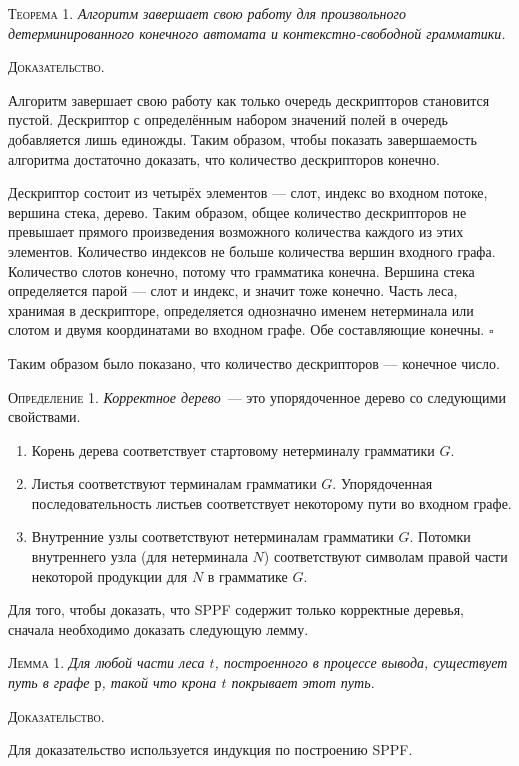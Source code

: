 \textsc{Теорема 1.} 
\textit{Алгоритм завершает свою работу для произвольного детерминированного конечного автомата и контекстно-свободной грамматики.}

\textsc{Доказательство.}

Алгоритм завершает свою работу как только очередь дескрипторов становится пустой. Дескриптор с определённым набором значений полей в очередь добавляется лишь единожды. Таким образом, чтобы показать завершаемость алгоритма достаточно доказать, что количество дескрипторов конечно. 

Дескриптор состоит из четырёх элементов --- слот, индекс во входном потоке, вершина стека, дерево. Таким образом, общее количество дескрипторов не превышает прямого произведения возможного количества каждого из этих элементов. Количество индексов не больше количества вершин входного графа. Количество слотов конечно, потому что грамматика конечна. Вершина стека определяется парой --- слот и индекс, и значит тоже конечно. Часть леса, хранимая в дескрипторе, определяется однозначно именем нетерминала или слотом и двумя координатами во входном графе. Обе составляющие конечны. $\square$

Таким образом было показано, что количество дескрипторов --- конечное число.

\textsc{Определение 1.} 
\emph{Корректное дерево}~--- это упорядоченное дерево со следующими свойствами.
\begin{enumerate}
  \item Корень дерева соответствует стартовому нетерминалу грамматики $G$.
  \item Листья соответствуют терминалам грамматики $G$. Упорядоченная последовательность листьев соответствует некоторому пути во входном графе.
  \item Внутренние узлы соответствуют нетерминалам грамматики $G$. Потомки внутреннего узла (для нетерминала $N$) соответствуют символам правой части некоторой продукции для $N$ в грамматике $G$.
\end{enumerate}

Для того, чтобы доказать, что SPPF содержит только корректные деревья, сначала необходимо доказать следующую лемму.

\textsc{Лемма 1.} 
\textit{Для любой части леса $t$, построенного в процессе вывода, существует путь в графе $р$, такой что крона $t$ покрывает этот путь. }

\textsc{Доказательство.}

Для доказательство используется индукция по построению SPPF. 

